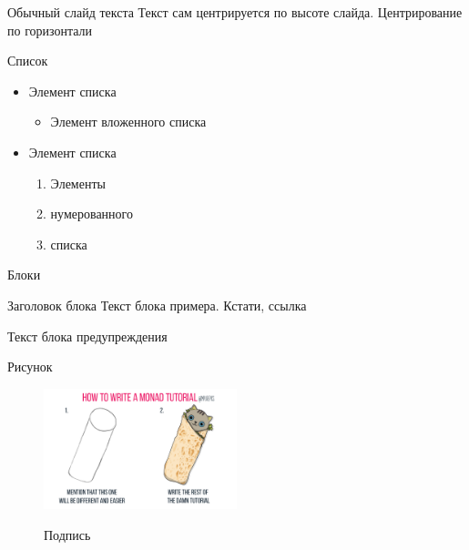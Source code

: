 \begin{frame}
\titlepage
\end{frame}

\begin{frame}{Обычный слайд текста}
Текст сам центрируется по высоте слайда. Центрирование по горизонтали 
\end{frame}


\begin{frame}{Список}
\begin{itemize}
	\item Элемент списка
	\begin{itemize}
		\item Элемент вложенного списка
	\end{itemize}
	\item Элемент списка
	\begin{enumerate}
		\item Элементы
		\item нумерованного
		\item списка
	\end{enumerate}
\end{itemize}
\end{frame}

\begin{frame}{Блоки}
\begin{exampleblock}{Заголовок блока}
	Текст блока примера. Кстати, ссылка \cite{kingma2014adam}
\end{exampleblock}

\begin{alertblock}{}
	Текст блока предупреждения 
\end{alertblock}

\end{frame}

\begin{frame}{Рисунок}
\begin{figure}[H]
	\includegraphics[width=0.5\textwidth]{fig/sample.png}
	\label{fig:sample}
	\caption{Подпись}
\end{figure}
\end{frame}

